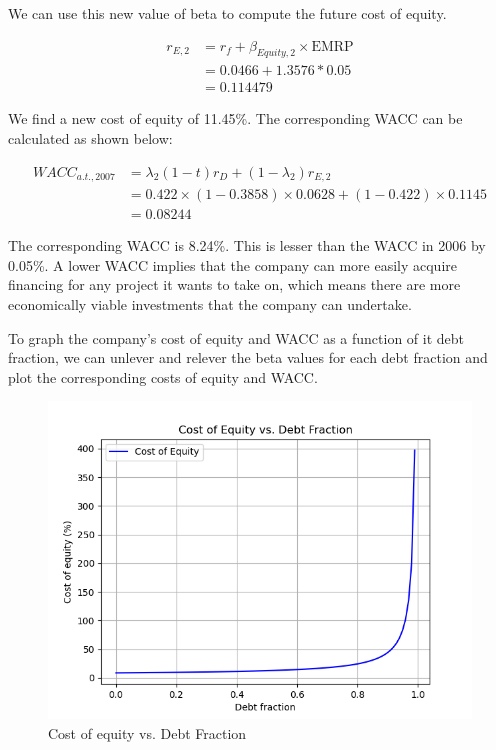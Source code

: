 \documentclass[letterpaper]{article}
\begin{document}
We can use this new value of beta to compute the future cost of equity.

\begin{align*}
r_{E,2} &= r_f + \beta_{Equity, 2} \times \text{EMRP} \\
    &= 0.0466 + 1.3576 * 0.05 \\
    &= 0.114479
\end{align*}

We find a new cost of equity of 11.45\%. The corresponding WACC can be calculated as shown below:

\begin{align*}
WACC_{a.t., 2007} &= \lambda_2 (1-t) r_D + (1-\lambda_2)r_{E,2} \\
            &= 0.422 \times (1 - 0.3858) \times 0.0628 + (1 - 0.422) \times 0.1145 \\
            &= 0.08244
\end{align*}

The corresponding WACC is 8.24\%. This is lesser than the WACC in 2006 by 0.05\%. A lower WACC implies that the company can more easily acquire financing for any project it wants to take on, which means there are more economically viable investments that the company can undertake.

To graph the company's cost of equity and WACC as a function of it debt fraction, we can unlever and relever the beta values for each debt fraction and plot the corresponding costs of equity and WACC.

\begin{figure}[H]
    \includegraphics[width=\linewidth]{images/cost_of_equity.png}
    \caption{Cost of equity vs. Debt Fraction}
\end{figure}
\end{document}
